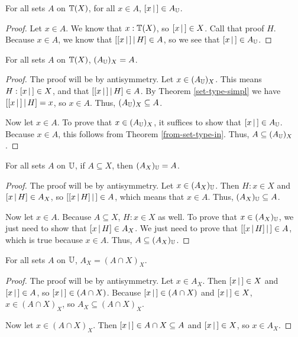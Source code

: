 \documentclass[../math.tex]{subfiles}
\begin{document}
\begin{theorem} \label{from-set-type-in}
    For all sets $A$ on $\mathbb{T}(X)$, for all $x \in A$, $[ x\, |\,] \in A_{\mathbb{U}}$.
\end{theorem}
\begin{proof}
    Let $x \in A$.  We know that $x : \mathbb{T}(X)$, so $[ x\, |\,] \in X$.  Call that
    proof $H$.  Because $x \in A$, we know that $[ [ x\, |\,] \, | \, H ] \in A$, so we
    see that $[ x\, |\,] \in A_{\mathbb{U}}$.
\end{proof}

\begin{theorem} \label{to-from-set-type}
    For all sets $A$ on $\mathbb{T}(X)$, $(A_{\mathbb{U}})_X = A$.
\end{theorem}
\begin{proof}
    The proof will be by antisymmetry.  Let $x \in (A_{\mathbb{U}})_X$.  This means $H :
    [ x\, |\,] \in X$, and that $[ [ x\, |\,] \, | \, H ] \in A$.  By Theorem
    \ref{set-type-simpl} we have $[ [ x\, |\,] \, | \, H ] = x$, so $x \in A$.  Thus,
    $(A_{\mathbb{U}})_X \subseteq A$.

    Now let $x \in A$.  To prove that $x \in (A_{\mathbb{U}})_X$, it suffices to show that
    $[ x\, |\,] \in A_{\mathbb{U}}$.  Because $x \in A$, this follows from Theorem
    \ref{from-set-type-in}.  Thus, $A \subseteq (A_{\mathbb{U}})_X$.
\end{proof}

\begin{theorem} \label{from-to-set-type}
    For all sets $A$ on $\mathbb{U}$, if $A \subseteq X$, then $(A_X)_{\mathbb{U}} = A$.
\end{theorem}
\begin{proof}
    The proof will be by antisymmetry.  Let $x \in (A_X)_{\mathbb{U}}$.  Then $H : x \in
    X$ and $[ x \, | \, H ] \in A_X$, so $[ [ x \, | \, H ]\, |\,] \in A$, which means that $x
    \in A$.  Thus, $(A_X)_{\mathbb{U}} \subseteq A$.

    Now let $x \in A$.  Because $A \subseteq X$, $H : x \in X$ as well.  To
    prove that $x \in (A_X)_{\mathbb{U}}$, we just need to show that $[ x \, | \, H ] \in A_X$.
    We just need to prove that $[ [ x \, | \, H ]\, |\,] \in A$, which is true because $x
    \in A$.  Thus, $A \subseteq (A_X)_{\mathbb{U}}$.
\end{proof}

\begin{theorem} \label{to-set-type-inter}
    For all sets $A$ on $\mathbb{U}$, $A_X = (A \cap X)_X$.
\end{theorem}
\begin{proof}
    The proof will be by antisymmetry.  Let $x \in A_X$.  Then $[ x\, |\,] \in X$
    and $[ x\, |\,] \in A$, so $[ x\, |\,] \in (A \cap X)$.  Because $[ x\, |\,] \in (A \cap
    X)$ and $[ x\, |\,] \in X$, $x \in (A \cap X)_X$, so $A_X \subseteq (A \cap
    X)_X$.

    Now let $x \in (A \cap X)_X$.  Then $[ x\, |\,] \in A \cap X \subseteq A$ and
    $[ x\, |\,] \in X$, so $x \in A_X$.
\end{proof}
\end{document}
